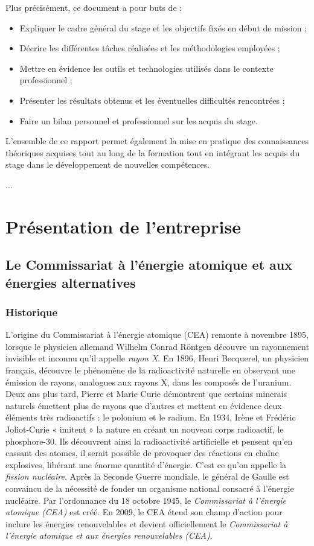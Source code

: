 \documentclass[12pt,a4paper]{report}
\begin{document}
Plus précisément, ce document a pour buts de :
\begin{itemize}
  \item Expliquer le cadre général du stage et les objectifs fixés en début de mission ;
  \item Décrire les différentes tâches réalisées et les méthodologies employées ;
  \item Mettre en évidence les outils et technologies utilisés dans le contexte professionnel ;
  \item Présenter les résultats obtenus et les éventuelles difficultés rencontrées ;
  \item Faire un bilan personnel et professionnel sur les acquis du stage.
\end{itemize}

L'ensemble de ce rapport permet également la mise en pratique des connaissances théoriques acquises tout au long de la formation tout en intégrant les acquis du stage dans le développement de nouvelles compétences.

... %

\chapter{Présentation de l'entreprise}
\section{Le Commissariat à l'énergie atomique et aux énergies alternatives}
\subsection{Historique}

L'origine du Commissariat à l'énergie atomique (CEA) remonte à novembre 1895, lorsque le physicien allemand Wilhelm Conrad Röntgen découvre un rayonnement invisible et inconnu qu'il appelle \textit{rayon X}. En 1896, Henri Becquerel, un physicien français, découvre le phénomène de la radioactivité naturelle en observant une émission de rayons, analogues aux rayons X, dans les composés de l'uranium. Deux ans plus tard, Pierre et Marie Curie démontrent que certains minerais naturels émettent plus de rayons que d'autres et mettent en évidence deux éléments très radioactifs : le polonium et le radium. En 1934, Irène et Frédéric Joliot-Curie « imitent » la nature en créant un nouveau corps radioactif, le phosphore-30. Ils découvrent ainsi la radioactivité artificielle et pensent qu'en cassant des atomes, il serait possible de provoquer des réactions en chaîne explosives, libérant une énorme quantité d’énergie. C'est ce qu'on appelle la \textit{fission nucléaire}. Après la Seconde Guerre mondiale, le général de Gaulle est convaincu de la nécessité de fonder un organisme national consacré à l'énergie nucléaire. Par l'ordonnance du 18 octobre 1945, le \textit{Commissariat à l'énergie atomique (CEA)} est créé. En 2009, le CEA étend son champ d'action pour inclure les énergies renouvelables et devient officiellement le \textit{Commissariat à l'énergie atomique et aux énergies renouvelables (CEA)}.
\end{document}

